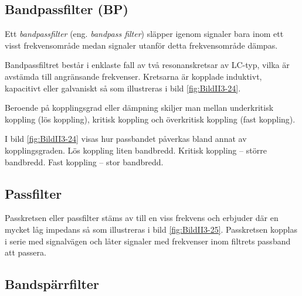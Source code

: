 \subsection{Bandpassfilter (BP)}


Ett \emph{bandpassfilter} (eng. \emph{bandpass filter}) släpper igenom signaler
bara inom ett visst frekvensområde medan signaler utanför detta frekvensområde dämpas.

Bandpassfiltret består i enklaste fall av två resonanskretsar av LC-typ, vilka
är avstämda till angränsande frekvenser. Kretsarna är kopplade induktivt,
kapacitivt eller galvaniskt så som illustreras i bild \ref{fig:BildII3-24}.

Beroende på kopplingsgrad eller dämpning skiljer man mellan underkritisk
koppling (lös koppling), kritisk koppling och överkritisk koppling
(fast koppling).

I bild \ref{fig:BildII3-24} visas hur passbandet påverkas bland annat av kopplingsgraden.
Lös koppling liten bandbredd.
Kritisk koppling -- större bandbredd.
Fast koppling -- stor bandbredd.


\subsection{Passfilter}

Passkretsen eller passfilter stäms av till en viss frekvens och erbjuder där
en mycket låg impedans så som illustreras i bild \ref{fig:BildII3-25}.
Passkretsen kopplas i serie med signalvägen och låter signaler med
frekvenser inom filtrets passband att passera.


\subsection{Bandspärrfilter}

